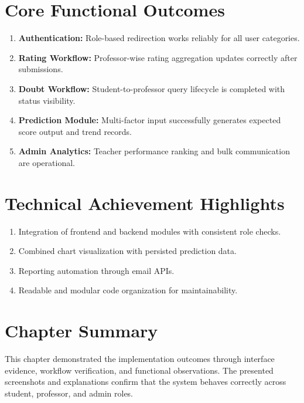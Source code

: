 \section{Core Functional Outcomes}
\begin{enumerate}[label=\Alph*., leftmargin=1.5em]
    \item \textbf{Authentication:} Role-based redirection works reliably for all user categories.
    \item \textbf{Rating Workflow:} Professor-wise rating aggregation updates correctly after submissions.
    \item \textbf{Doubt Workflow:} Student-to-professor query lifecycle is completed with status visibility.
    \item \textbf{Prediction Module:} Multi-factor input successfully generates expected score output and trend records.
    \item \textbf{Admin Analytics:} Teacher performance ranking and bulk communication are operational.
\end{enumerate}

\section{Technical Achievement Highlights}
\begin{enumerate}[label=\Alph*., leftmargin=1.5em]
    \item Integration of frontend and backend modules with consistent role checks.
    \item Combined chart visualization with persisted prediction data.
    \item Reporting automation through email APIs.
    \item Readable and modular code organization for maintainability.
\end{enumerate}

\section*{Chapter Summary}
This chapter demonstrated the implementation outcomes through interface evidence, workflow verification, and functional observations. The presented screenshots and explanations confirm that the system behaves correctly across student, professor, and admin roles.
